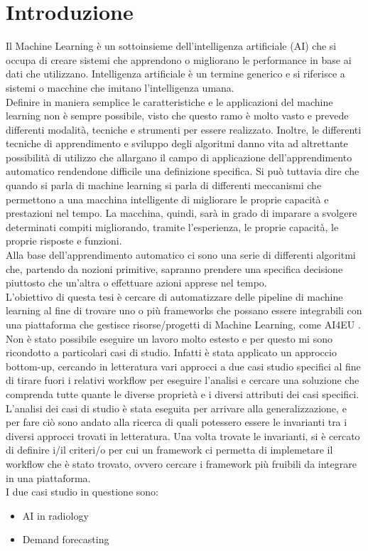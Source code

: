 \documentclass[12pt,a4paper]{report}
\begin{document}
\chapter{Introduzione}
\par
Il Machine Learning è un sottoinsieme dell'intelligenza artificiale (AI) che si occupa di creare sistemi che apprendono o migliorano le performance in base ai dati che utilizzano. Intelligenza artificiale è un termine generico e si riferisce a sistemi o macchine che imitano l'intelligenza umana.\\
Definire in maniera semplice le caratteristiche e le applicazioni del machine learning non è sempre possibile, visto che questo ramo è molto vasto e prevede differenti modalità, tecniche e strumenti per essere realizzato. Inoltre, le differenti tecniche di apprendimento e sviluppo degli algoritmi danno vita ad altrettante possibilità di utilizzo che allargano il campo di applicazione dell’apprendimento automatico rendendone difficile una definizione specifica. Si può tuttavia dire che quando si parla di machine learning si parla di differenti meccanismi che permettono a una macchina intelligente di migliorare le proprie capacità e prestazioni nel tempo. La macchina, quindi, sarà in grado di imparare a svolgere determinati compiti migliorando, tramite l’esperienza, le proprie capacità, le proprie risposte e funzioni.\\
Alla base dell’apprendimento automatico ci sono una serie di differenti algoritmi che, partendo da nozioni primitive, sapranno prendere una specifica decisione piuttosto che un’altra o effettuare azioni apprese nel tempo.\\
L'obiettivo di questa tesi è cercare di automatizzare delle pipeline di machine learning al fine di trovare uno o più frameworks che possano essere integrabili con una piattaforma che gestisce risorse/progetti di Machine Learning, come AI4EU \cite{AI4EU}.\\
Non è stato possibile eseguire un lavoro molto estesto e per questo mi sono ricondotto a particolari casi di studio. 
Infatti è stata applicato un approccio bottom-up, cercando in letteratura vari approcci a due casi studio specifici al fine di tirare fuori i relativi workflow per eseguire l'analisi e cercare una soluzione che comprenda tutte quante le diverse proprietà e i diversi attributi dei casi specifici.\\
L'analisi dei casi di studio è stata eseguita per arrivare alla generalizzazione, e per fare ciò sono andato alla ricerca di quali potessero essere le invarianti tra i diversi approcci trovati in letteratura. Una volta trovate le invarianti, si è cercato di definire i/il criteri/o per cui un framework ci permetta di implemetare il workflow che è stato trovato, ovvero cercare i framework più fruibili da integrare in una piattaforma.\\
I due casi studio in questione sono:
\begin{itemize}
    \item AI in radiology
    \item Demand forecasting
\end{itemize}
\end{document}

